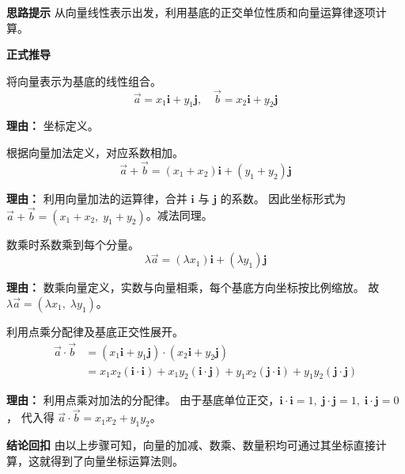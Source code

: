 \begin{proofbox}
	\textbf{\textcolor{CProof}{思路提示}}
	从向量线性表示出发，利用基底的正交单位性质和向量运算律逐项计算。

	\medskip
	\textbf{\textcolor{CProof}{正式推导}}
	\begin{description}[style=nextline, leftmargin=2.8em, labelsep=0.5em, itemsep=0.55em]
		\item[\textbf{步骤一（线性表示）：}]
			将向量表示为基底的线性组合。
			\[
				\vec{a}=x_1\mathbf{i}+y_1\mathbf{j},\quad \vec{b}=x_2\mathbf{i}+y_2\mathbf{j}
			\]
			\par\textbf{理由：} 坐标定义。
		\item[\textbf{步骤二（加法运算）：}]
			根据向量加法定义，对应系数相加。
			\[
				\vec{a}+\vec{b} = (x_1+x_2)\mathbf{i} + (y_1+y_2)\mathbf{j}
			\]
			\par\textbf{理由：} 利用向量加法的运算律，合并 $\mathbf{i}$ 与 $\mathbf{j}$ 的系数。 因此坐标形式为 $\vec{a}+\vec{b}=(x_1+x_2,\; y_1+y_2)$。减法同理。
		\item[\textbf{步骤三（数乘运算）：}]
			数乘时系数乘到每个分量。
			\[
				\lambda\vec{a} = (\lambda x_1)\mathbf{i} + (\lambda y_1)\mathbf{j}
			\]
			\par\textbf{理由：} 数乘向量定义，实数与向量相乘，每个基底方向坐标按比例缩放。 故 $\lambda\vec{a}=(\lambda x_1,\; \lambda y_1)$。
		\item[\textbf{步骤四（点乘运算）：}]
			利用点乘分配律及基底正交性展开。
			\[
				\begin{aligned}
					\vec{a}\cdot\vec{b} &= (x_1\mathbf{i}+y_1\mathbf{j})\cdot(x_2\mathbf{i}+y_2\mathbf{j}) \\ &= x_1x_2(\mathbf{i}\cdot\mathbf{i}) + x_1y_2(\mathbf{i}\cdot\mathbf{j}) + y_1x_2(\mathbf{j}\cdot\mathbf{i}) + y_1y_2(\mathbf{j}\cdot\mathbf{j})
			\end{aligned}
			\]
			\par\textbf{理由：} 利用点乘对加法的分配律。 由于基底单位正交，$\mathbf{i}\cdot\mathbf{i}=1,\; \mathbf{j}\cdot\mathbf{j}=1,\; \mathbf{i}\cdot\mathbf{j}=0$， 代入得 $\vec{a}\cdot\vec{b}=x_1x_2+y_1y_2$。
	\end{description}

	\medskip
	\textbf{\textcolor{CProof}{结论回扣}}
	由以上步骤可知，向量的加减、数乘、数量积均可通过其坐标直接计算，这就得到了向量坐标运算法则。
\end{proofbox}
